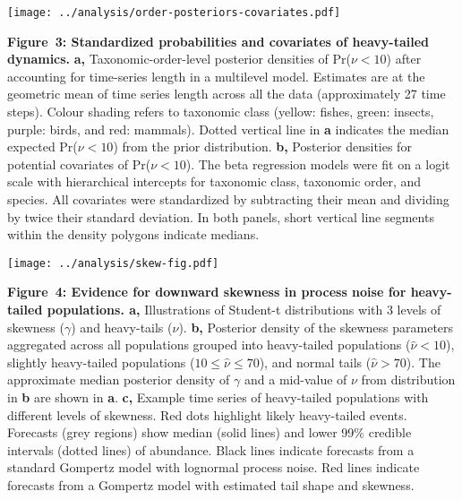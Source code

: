\clearpage

\begin{center}
\texttt{[image: ../analysis/order-posteriors-covariates.pdf]}
\end{center}

\textbf{Figure~3: Standardized probabilities and covariates of heavy-tailed dynamics.} \textbf{a,} Taxonomic-order-level posterior densities of Pr(\(\nu < 10\)) after accounting for time-series length in a multilevel model. Estimates are at the geometric mean of time series length across all the data (approximately 27 time steps). Colour shading refers to taxonomic class (yellow: fishes, green: insects, purple: birds, and red: mammals). Dotted vertical line in \textbf{a} indicates the median expected Pr(\(\nu < 10\)) from the prior distribution. \textbf{b,} Posterior densities for potential covariates of Pr(\(\nu < 10\)). The beta regression models were fit on a logit scale with hierarchical intercepts for taxonomic class, taxonomic order, and species. All covariates were standardized by subtracting their mean and dividing by twice their standard deviation. In both panels, short vertical line segments within the density polygons indicate medians.

\clearpage

\begin{center}
\texttt{[image: ../analysis/skew-fig.pdf]}
\end{center}

\textbf{Figure~4: Evidence for downward skewness in process noise for heavy-tailed populations. a,} Illustrations of Student-t distributions with 3 levels of skewness (\(\gamma\)) and heavy-tails (\(\nu\)). \textbf{b,} Posterior density of the skewness parameters aggregated across all populations grouped into heavy-tailed populations (\(\hat{\nu} < 10\)), slightly heavy-tailed populations (\(10 \leq \hat{\nu} \leq 70\)), and normal tails (\(\hat{\nu} > 70\)). The approximate median posterior density of \(\gamma\) and a mid-value of \(\nu\) from distribution in \textbf{b} are shown in \textbf{a}. \textbf{c,} Example time series of heavy-tailed populations with different levels of skewness. Red dots highlight likely heavy-tailed events. Forecasts (grey regions) show median (solid lines) and lower 99\% credible intervals (dotted lines) of abundance. Black lines indicate forecasts from a standard Gompertz model with lognormal process noise. Red lines indicate forecasts from a Gompertz model with estimated tail shape and skewness.

